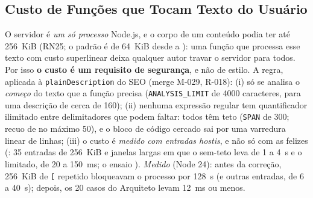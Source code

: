 \subsection{Custo de Funções que Tocam Texto do Usuário}\label{sec:arq-custo-entrada}

O servidor é \emph{um só processo} Node.js, e o corpo de um conteúdo podia ter até 256~KiB (RN25; o padrão é de 64~KiB desde a ): uma função que processa esse texto com custo superlinear deixa qualquer autor travar o servidor para todos. Por isso \textbf{o custo é um requisito de segurança}, e não de estilo. A regra, aplicada à \texttt{plainDescription} do SEO (merge M-029, R-018): (i) só se analisa o \emph{começo} do texto que a função precisa (\texttt{ANALYSIS\_LIMIT} de 4000 caracteres, para uma descrição de cerca de 160); (ii) nenhuma expressão regular tem quantificador ilimitado entre delimitadores que podem faltar: todos têm teto (\texttt{SPAN} de 300; recuo de no máximo 50), e o bloco de código cercado sai por uma varredura linear de linhas; (iii) o custo é \emph{medido com entradas hostis}, e não só com as felizes (: 35 entradas de 256~KiB e janelas largas em que o sem-teto leva de 1 a 4~s e o limitado, de 20 a 150~ms; o ensaio ). \emph{Medido} (Node 24): antes da correção, 256~KiB de \texttt{[} repetido bloqueavam o processo por 128~s (e outras entradas, de 6 a 40~s); depois, os 20 casos do Arquiteto levam 12~ms ou menos.

